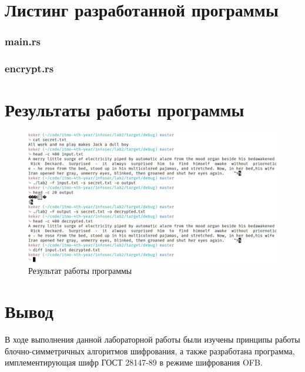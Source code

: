 \documentclass[12pt, a4paper]{article}
\begin{document}
\newpage
\section*{Листинг разработанной программы}

\subsubsection*{main.rs}



\newpage
\subsubsection*{encrypt.rs}



\newpage
\section*{Результаты работы программы}

\begin{figure}[h]
    \includegraphics[scale = 0.55]{res}
    \caption{Результат работы программы}
    \centering
\end{figure}

\section*{Вывод}

В ходе выполнения данной лабораторной работы были изучены
принципы работы блочно-симметричных алгоритмов шифрования,
а также разработана программа, имплементирующая шифр
ГОСТ 28147-89 в режиме шифрования OFB.
\end{document}
